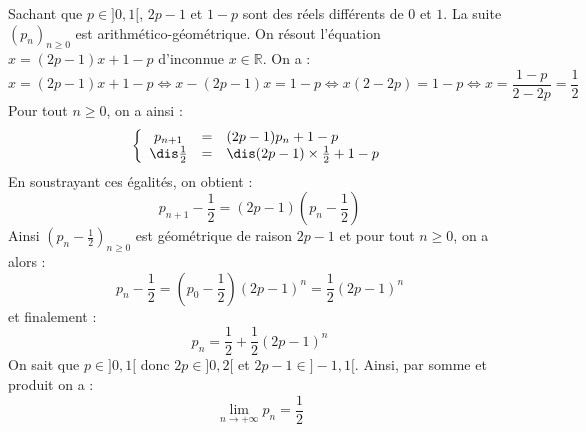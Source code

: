 \documentclass[a4paper,10pt]{report}
\begin{document}
\noindent Sachant que $p \in ]0,1[$, $2p-1$ et $1-p$ sont des réels différents de $0$ et $1$. La suite $(p_n)_{n \geq 0}$ est arithmético-géométrique. On résout l'équation $x=(2p-1)x+1-p$ d'inconnue $x \in \mathbb{R}$. On a :
\[ x= (2p-1)x+1-p \Longleftrightarrow x-(2p-1)x=1-p \Longleftrightarrow x(2-2p)= 1-p \Longleftrightarrow x = \frac{1-p}{2-2p} = \frac{1}{2} \]
Pour tout $n \geq 0$, on a ainsi :
\[ \left\lbrace \begin{array}{ccl}
p_{n+1} & = & (2p-1)p_n+1-p \\
\dis \frac{1}{2} & = & \dis(2p-1) \times \frac{1}{2} + 1-p \\
\end{array}\right.\]
En soustrayant ces égalités, on obtient :
\[ p_{n+1} - \frac{1}{2} = (2p-1)\left(p_n - \frac{1}{2} \right) \]
Ainsi $\left( p_n - \frac{1}{2} \right)_{n \geq 0}$ est géométrique de raison $2p-1$ et pour tout $n \geq 0$, on a alors :
\[ p_n - \frac{1}{2} = \left( p_0 - \frac{1}{2} \right) (2p-1)^n =  \frac{1}{2} (2p-1)^n \]
et finalement :
\[ p_n = \frac{1}{2} + \frac{1}{2} (2p-1)^n \]
On sait que $p \in ]0,1[$ donc $2p \in ]0,2[$ et $2p-1 \in ]-1,1[$. Ainsi, par somme et produit on a :
\[ \lim_{n \rightarrow + \infty} p_n = \frac{1}{2} \]
\end{document}
